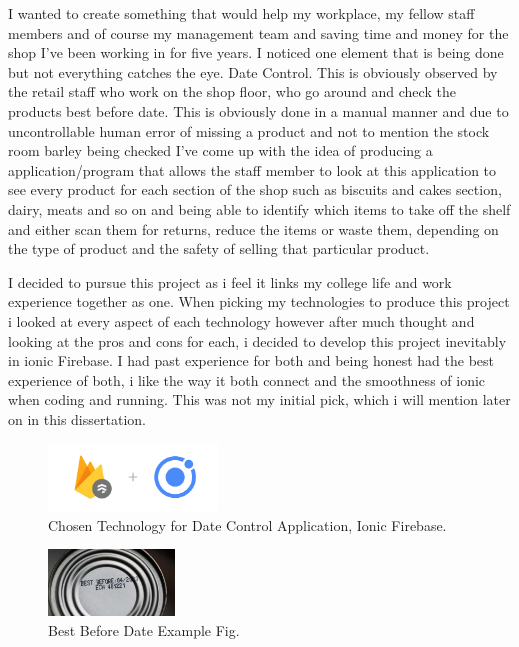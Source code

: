 I wanted to create something that would help my workplace, my fellow staff members and of course my management team and saving time and money for the shop I've been working in for five years. I noticed one element that is being done but not everything catches the eye. Date Control. This is obviously observed by the retail staff who work on the shop floor, who go around and check the products best before date.  This is obviously done in a manual manner and due to uncontrollable human error of missing a product and not to mention the stock room barley being checked I've come up with the idea of producing a application/program that allows the staff member to look at this application to see every product for each section of the shop such as biscuits and cakes section, dairy, meats and so on and being able to identify which items to take off the shelf and either scan them for returns, reduce the items or waste them, depending on the type of product and the safety of selling that particular product.   
\newline

I decided to pursue this project as i feel it links my college life and work experience together as one. When picking my technologies to produce this project i looked at every aspect of each technology however after much thought and looking at the pros and cons for each, i decided to develop this project inevitably in ionic Firebase. I had past experience for both and being honest had the best experience of both, i like the way it both connect and the smoothness of ionic when coding and running. This was not my initial pick, which i will mention later on in this dissertation.

\begin{figure}[h!]
	\caption{Chosen Technology for Date Control Application, Ionic Firebase.}
	\label{image:ionicfirebase}
	\centering
	\includegraphics[width=0.4\textwidth]{images/ionicfirebase.png}
\end{figure}

\newpage

\begin{figure}[h!]
	\caption{Best Before Date Example Fig.}
	\label{image:bbdate}
	\centering
	\includegraphics[width=0.3\textwidth]{images/bbdate.jpg}
\end{figure}

